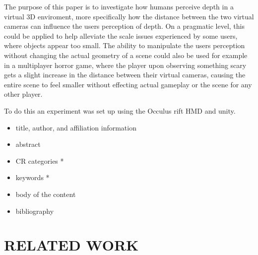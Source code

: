 \documentclass[tog]{acmsiggraph}
\begin{document}
The purpose of this paper is to investigate how humans perceive depth in a virtual 3D enviroment, more specifically how the distance between the two virtual cameras can influence the users perception of depth. On a pragmatic level, this could be applied to help alleviate the scale issues experienced by some users, where objects appear too small. The ability to manipulate the users perception without changing the actual geometry of a scene could also be used for example in a multiplayer horror game, where the player upon observing something scary gets a slight increase in the distance between their virtual cameras, causing the entire scene to feel smaller without effecting actual gameplay or the scene for any other player.    

To do this an experiment was set up using the Occulus rift HMD and unity.

\begin{itemize}
\item title, author, and affiliation information
\item abstract
\item CR categories *
\item keywords *
\item body of the content
\item bibliography
\end{itemize}



\section{RELATED WORK}
\end{document}
